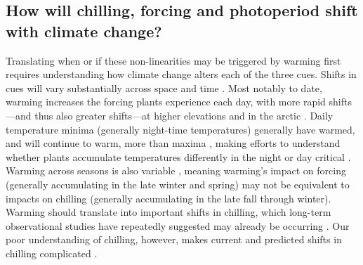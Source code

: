 \documentclass[11pt,letter]{article}
\begin{document}
\subsection{How will chilling, forcing and photoperiod shift with climate change?}
Translating when or if these non-linearities may be triggered by warming first requires understanding how climate change alters each of the three cues. Shifts in cues will vary substantially across space and time \citep{Burrows2011pace}. Most notably to date, warming increases the forcing plants experience each day, with more rapid shifts---and thus also greater shifts---at higher elevations and in the arctic \citep{IPCC:2014sm}. Daily temperature minima (generally night-time temperatures) generally have warmed, and will continue to warm, more than maxima \citep[though this effect varies spatially,][]{Alexander:2006qy}, making efforts to understand whether plants accumulate temperatures differently in the night or day critical \citep{prasad2008,shen2018}. \\ 

Warming across seasons is also variable \citep{Alexander:2006qy}, meaning warming's impact on forcing (generally accumulating in the late winter and spring) may not be equivalent to impacts on chilling (generally accumulating in the late fall through winter). Warming should translate into important shifts in chilling, which long-term observational studies have repeatedly suggested may already be occurring \citep{fu2015,piao2017}.  Our poor understanding of chilling, however, makes current and predicted shifts in chilling complicated \citep{chuine2016}. \\
\end{document}
